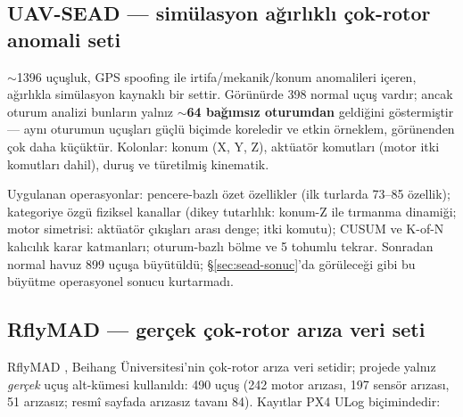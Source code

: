 \documentclass[11pt,a4paper]{article}
\begin{document}
\subsection{UAV-SEAD --- simülasyon ağırlıklı çok-rotor anomali seti}

$\sim$1396 uçuşluk, GPS spoofing ile irtifa/mekanik/konum anomalileri içeren,
ağırlıkla simülasyon kaynaklı bir settir. Görünürde 398 normal uçuş vardır;
ancak oturum analizi bunların yalnız \textbf{$\sim$64 bağımsız oturumdan}
geldiğini göstermiştir --- aynı oturumun uçuşları güçlü biçimde koreledir ve
etkin örneklem, görünenden çok daha küçüktür. Kolonlar: konum (X, Y, Z),
aktüatör komutları (motor itki komutları dahil), duruş ve türetilmiş kinematik.

Uygulanan operasyonlar: pencere-bazlı özet özellikler (ilk turlarda 73--85
özellik); kategoriye özgü fiziksel kanallar (dikey tutarlılık: konum-Z ile
tırmanma dinamiği; motor simetrisi: aktüatör çıkışları arası denge; itki
komutu); CUSUM ve K-of-N kalıcılık karar katmanları; oturum-bazlı bölme ve 5
tohumlu tekrar. Sonradan normal havuz 899 uçuşa büyütüldü; \S\ref{sec:sead-sonuc}'da
görüleceği gibi bu büyütme operasyonel sonucu kurtarmadı.

\subsection{RflyMAD --- gerçek çok-rotor arıza veri seti}
\label{sec:rfly-veri}

RflyMAD \cite{rflymad}, Beihang Üniversitesi'nin çok-rotor arıza veri setidir;
projede yalnız \emph{gerçek} uçuş alt-kümesi kullanıldı: 490 uçuş (242 motor
arızası, 197 sensör arızası, 51 arızasız; resmî sayfada arızasız tavanı 84).
Kayıtlar PX4 ULog biçimindedir:
\end{document}
